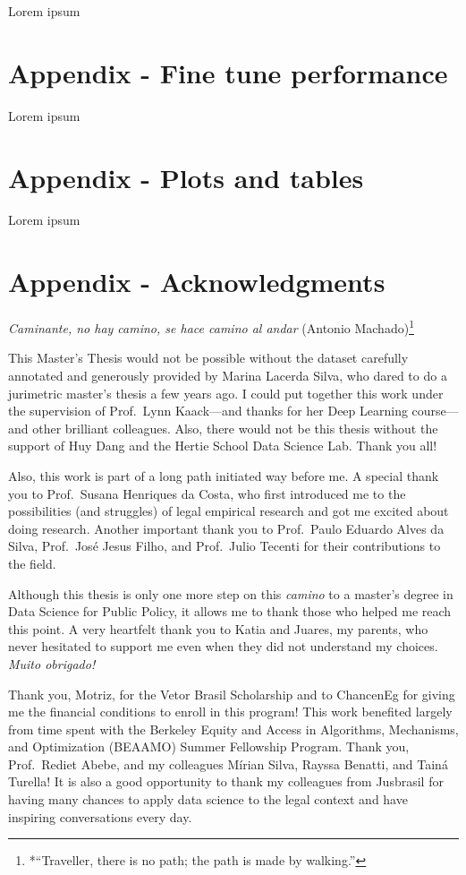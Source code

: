 \documentclass[
  12pt,
]{article}
\begin{document}
Lorem ipsum

\section{Appendix - Fine tune performance}\label{sec-ft-performance}

Lorem ipsum

\section{Appendix - Plots and tables}\label{sec-plots-tables}

Lorem ipsum

\section{Appendix - Acknowledgments}\label{sec-thank-you}

\emph{Caminante, no hay camino, se hace camino al andar} (Antonio
Machado)\footnote{*``Traveller, there is no path; the path is made by
  walking.''}

This Master's Thesis would not be possible without the dataset carefully
annotated and generously provided by Marina Lacerda Silva, who dared to
do a jurimetric master's thesis a few years ago. I could put together
this work under the supervision of Prof.~Lynn Kaack---and thanks for her
Deep Learning course---and other brilliant colleagues. Also, there would
not be this thesis without the support of Huy Dang and the Hertie School
Data Science Lab. Thank you all!

Also, this work is part of a long path initiated way before me. A
special thank you to Prof.~Susana Henriques da Costa, who first
introduced me to the possibilities (and struggles) of legal empirical
research and got me excited about doing research. Another important
thank you to Prof.~Paulo Eduardo Alves da Silva, Prof.~José Jesus Filho,
and Prof.~Julio Tecenti for their contributions to the field.

Although this thesis is only one more step on this \emph{camino} to a
master's degree in Data Science for Public Policy, it allows me to thank
those who helped me reach this point. A very heartfelt thank you to
Katia and Juares, my parents, who never hesitated to support me even
when they did not understand my choices. \emph{Muito obrigado!}

Thank you, Motriz, for the Vetor Brasil Scholarship and to ChancenEg for
giving me the financial conditions to enroll in this program! This work
benefited largely from time spent with the Berkeley Equity and Access in
Algorithms, Mechanisms, and Optimization (BEAAMO) Summer Fellowship
Program. Thank you, Prof.~Rediet Abebe, and my colleagues Mírian Silva,
Rayssa Benatti, and Tainá Turella! It is also a good opportunity to
thank my colleagues from Jusbrasil for having many chances to apply data
science to the legal context and have inspiring conversations every day.
\end{document}
